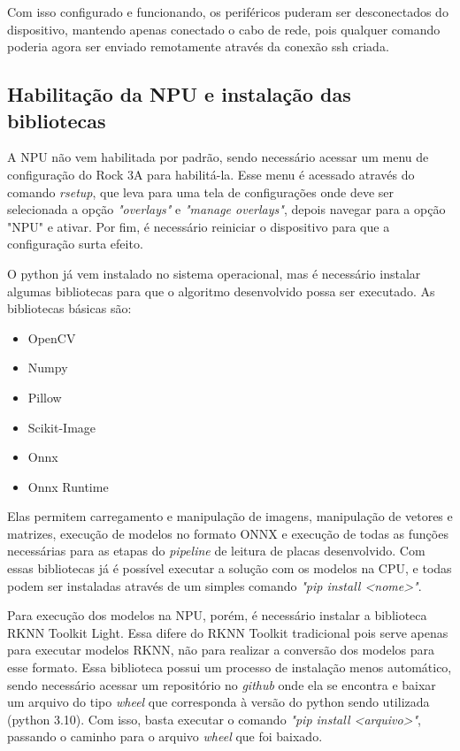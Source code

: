 Com isso configurado e funcionando, os periféricos puderam ser desconectados do dispositivo, mantendo apenas conectado o cabo de rede, pois qualquer comando poderia agora ser enviado remotamente através da conexão ssh criada.

\subsection{Habilitação da NPU e instalação das bibliotecas}
A NPU não vem habilitada por padrão, sendo necessário acessar um menu de configuração do Rock 3A para habilitá-la. Esse menu é acessado através do comando \textit{rsetup}, que leva para uma tela de configurações onde deve ser selecionada a opção \textit{"overlays"} e \textit{"manage overlays"}, depois navegar para a opção "NPU" e ativar. Por fim, é necessário reiniciar o dispositivo para que a configuração surta efeito.

O python já vem instalado no sistema operacional, mas é necessário instalar algumas bibliotecas para que o algoritmo desenvolvido possa ser executado. As bibliotecas básicas são:
\begin{itemize} 
\item OpenCV 
\item Numpy 
\item Pillow 
\item Scikit-Image 
\item Onnx 
\item Onnx Runtime 
\end{itemize}

Elas permitem carregamento e manipulação de imagens, manipulação de vetores e matrizes, execução de modelos no formato ONNX e execução de todas as funções necessárias para as etapas do \textit{pipeline} de leitura de placas desenvolvido. Com essas bibliotecas já é possível executar a solução com os modelos na CPU, e todas podem ser instaladas através de um simples comando \textit{"pip install <nome>"}.

Para execução dos modelos na NPU, porém, é necessário instalar a biblioteca RKNN Toolkit Light. Essa difere do RKNN Toolkit tradicional pois serve apenas para executar modelos RKNN, não para realizar a conversão dos modelos para esse formato. Essa biblioteca possui um processo de instalação menos automático, sendo necessário acessar um repositório no \textit{github} onde ela se encontra e baixar um arquivo do tipo \textit{wheel} que corresponda à versão do python sendo utilizada (python 3.10). Com isso, basta executar o comando \textit{"pip install <arquivo>"}, passando o caminho para o arquivo \textit{wheel} que foi baixado.


